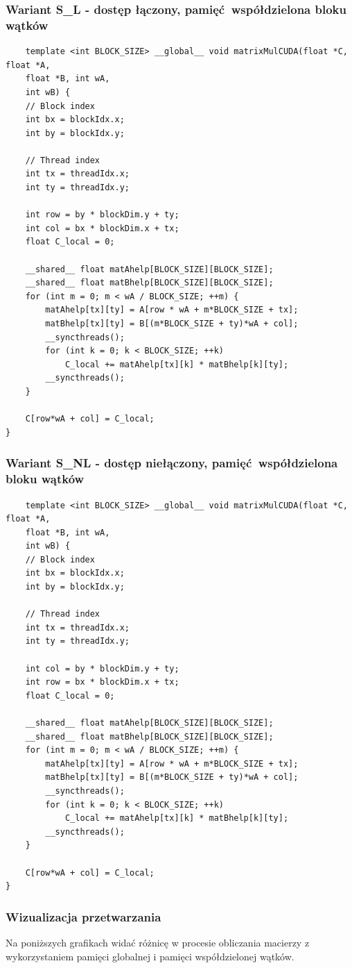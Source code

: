 \documentclass[10pt,a4paper]{article}
\begin{document}
\subsubsection*{Wariant S\_L - dostęp łączony, pamięć współdzielona bloku wątków}
\begin{lstlisting}
	template <int BLOCK_SIZE> __global__ void matrixMulCUDA(float *C, float *A,
	float *B, int wA,
	int wB) {
	// Block index
	int bx = blockIdx.x;
	int by = blockIdx.y;

	// Thread index
	int tx = threadIdx.x;
	int ty = threadIdx.y;

	int row = by * blockDim.y + ty;
	int col = bx * blockDim.x + tx;
	float C_local = 0;

	__shared__ float matAhelp[BLOCK_SIZE][BLOCK_SIZE];
	__shared__ float matBhelp[BLOCK_SIZE][BLOCK_SIZE];
	for (int m = 0; m < wA / BLOCK_SIZE; ++m) {
		matAhelp[tx][ty] = A[row * wA + m*BLOCK_SIZE + tx];
		matBhelp[tx][ty] = B[(m*BLOCK_SIZE + ty)*wA + col];
		__syncthreads();
		for (int k = 0; k < BLOCK_SIZE; ++k)
			C_local += matAhelp[tx][k] * matBhelp[k][ty];
		__syncthreads();
	}

	C[row*wA + col] = C_local;
}
\end{lstlisting}

\subsubsection*{Wariant S\_NL - dostęp niełączony, pamięć współdzielona bloku wątków}
\begin{lstlisting}
	template <int BLOCK_SIZE> __global__ void matrixMulCUDA(float *C, float *A,
	float *B, int wA,
	int wB) {
	// Block index
	int bx = blockIdx.x;
	int by = blockIdx.y;

	// Thread index
	int tx = threadIdx.x;
	int ty = threadIdx.y;

	int col = by * blockDim.y + ty;
	int row = bx * blockDim.x + tx;
	float C_local = 0;

	__shared__ float matAhelp[BLOCK_SIZE][BLOCK_SIZE];
	__shared__ float matBhelp[BLOCK_SIZE][BLOCK_SIZE];
	for (int m = 0; m < wA / BLOCK_SIZE; ++m) {
		matAhelp[tx][ty] = A[row * wA + m*BLOCK_SIZE + tx];
		matBhelp[tx][ty] = B[(m*BLOCK_SIZE + ty)*wA + col];
		__syncthreads();
		for (int k = 0; k < BLOCK_SIZE; ++k)
			C_local += matAhelp[tx][k] * matBhelp[k][ty];
		__syncthreads();
	}

	C[row*wA + col] = C_local;
}
\end{lstlisting}

\subsubsection*{Wizualizacja przetwarzania}
Na poniższych grafikach widać różnicę w procesie obliczania macierzy z wykorzystaniem
pamięci globalnej i pamięci współdzielonej wątków.\\
\end{document}
